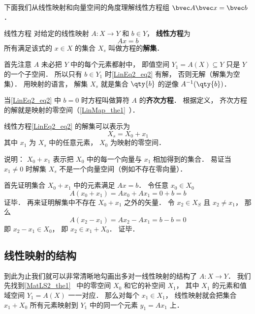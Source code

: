 

下面我们从线性映射和向量空间的角度理解线性方程组 $\bvec A \bvec x = \bvec b$．


\begin{definition}{线性方程}
对给定的线性映射 $A:X\to Y$ 和 $b \in Y$， \textbf{线性方程}为
\begin{equation}\label{LinEq2_eq2}
Ax = b
\end{equation}
所有满足该式的 $x \in X$ 的集合 $X_s$ 叫做方程的\textbf{解集}．
\end{definition}

首先注意 $A$ 未必把 $Y$ 中的每个元素都射中， 即值空间 $Y_1 = A(X) \subseteq Y$ 只是 $Y$ 的一个子空间． 所以只有 $b \in Y_1$ 时\autoref{LinEq2_eq2} 有解， 否则无解（解集为空集）． 用映射的语言， 解集 $X_s$ 就是集合 $\qty{b}$ 的逆像 $A^{-1}(\qty{b})$．

当\autoref{LinEq2_eq2} 中 $b = 0$ 时方程叫做算符 $A$ 的\textbf{齐次方程}． 根据定义， 齐次方程的解就是映射的零空间（\autoref{LinMap_the1}~）．

\begin{theorem}{}
线性方程\autoref{LinEq2_eq2} 的解集可以表示为
\begin{equation}\label{LinEq2_eq1}
X_s = X_0 + x_1
\end{equation}
其中 $x_1$ 为 $X_s$ 中的任意元素，  $X_0$ 为映射的零空间．
\end{theorem}
说明： $X_0 + x_1$ 表示把 $X_0$ 中的每一个向量与 $x_1$ 相加得到的集合． 易证当 $x_1 \ne 0$ 时解集 $X_s$ 不是一个向量空间（例如不存在零向量）．

首先证明集合 $X_0 + x_1$ 中的元素满足 $Ax = b$． 令任意 $x_0 \in X_0$
\begin{equation}
A(x_0 + x_1) = Ax_0 + Ax_1 = 0 + b = b
\end{equation}
证毕． 再来证明解集中不存在 $X_0 + x_1$ 之外的矢量． 令 $x_2 \in X_S$ 且 $x_2 \ne x_1$， 那么
\begin{equation}
A(x_2 - x_1) = Ax_2 - Ax_1 = b - b = 0
\end{equation}
即 $x_2 - x_1 \in X_0$， 即 $x_2 \in x_1 + X_0$． 证毕．

\subsection{线性映射的结构}
到此为止我们就可以非常清晰地勾画出多对一线性映射的结构了 $A:X\to Y$． 我们先找到\autoref{MatLS2_the1}~ 中的零空间 $X_0$ 和它的补空间 $X_1$， 其中 $X_1$ 的元素和值域空间 $Y_1 = A(X)$ 一一对应． 那么对每个 $x_1 \in X_1$， 线性映射就会把集合 $x_1 + X_0$ 所有元素映射到 $Y_1$ 中的同一个元素 $y_1 = Ax_1$ 上．

